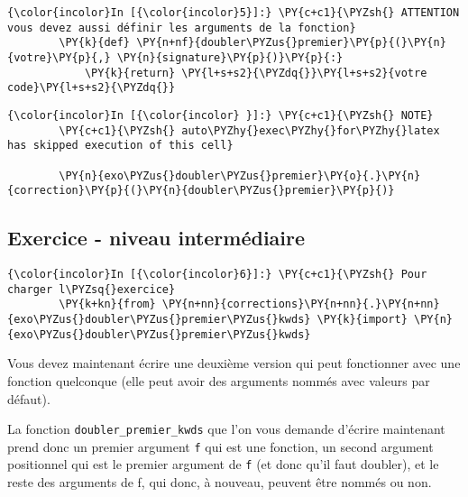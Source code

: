     \begin{Verbatim}[commandchars=\\\{\},frame=single,framerule=0.3mm,rulecolor=\color{cellframecolor}]
{\color{incolor}In [{\color{incolor}5}]:} \PY{c+c1}{\PYZsh{} ATTENTION vous devez aussi définir les arguments de la fonction}
        \PY{k}{def} \PY{n+nf}{doubler\PYZus{}premier}\PY{p}{(}\PY{n}{votre}\PY{p}{,} \PY{n}{signature}\PY{p}{)}\PY{p}{:}
            \PY{k}{return} \PY{l+s+s2}{\PYZdq{}}\PY{l+s+s2}{votre code}\PY{l+s+s2}{\PYZdq{}}
\end{Verbatim}


    \begin{Verbatim}[commandchars=\\\{\},frame=single,framerule=0.3mm,rulecolor=\color{cellframecolor}]
{\color{incolor}In [{\color{incolor} }]:} \PY{c+c1}{\PYZsh{} NOTE}
        \PY{c+c1}{\PYZsh{} auto\PYZhy{}exec\PYZhy{}for\PYZhy{}latex has skipped execution of this cell}
        
        \PY{n}{exo\PYZus{}doubler\PYZus{}premier}\PY{o}{.}\PY{n}{correction}\PY{p}{(}\PY{n}{doubler\PYZus{}premier}\PY{p}{)}
\end{Verbatim}


    \hypertarget{exercice---niveau-intermuxe9diaire}{%
\subsection{Exercice - niveau
intermédiaire}\label{exercice---niveau-intermuxe9diaire}}

    \begin{Verbatim}[commandchars=\\\{\},frame=single,framerule=0.3mm,rulecolor=\color{cellframecolor}]
{\color{incolor}In [{\color{incolor}6}]:} \PY{c+c1}{\PYZsh{} Pour charger l\PYZsq{}exercice}
        \PY{k+kn}{from} \PY{n+nn}{corrections}\PY{n+nn}{.}\PY{n+nn}{exo\PYZus{}doubler\PYZus{}premier\PYZus{}kwds} \PY{k}{import} \PY{n}{exo\PYZus{}doubler\PYZus{}premier\PYZus{}kwds}
\end{Verbatim}


    Vous devez maintenant écrire une deuxième version qui peut fonctionner
avec une fonction quelconque (elle peut avoir des arguments nommés avec
valeurs par défaut).

La fonction \texttt{doubler\_premier\_kwds} que l'on vous demande
d'écrire maintenant prend donc un premier argument \texttt{f} qui est
une fonction, un second argument positionnel qui est le premier argument
de \texttt{f} (et donc qu'il faut doubler), et le reste des arguments de
f, qui donc, à nouveau, peuvent être nommés ou non.

